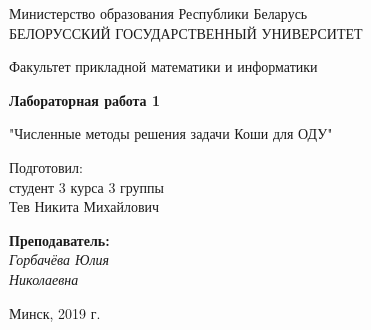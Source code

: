 \documentclass{article}%
\begin{document}
%

\begin{titlepage}
  \begin{center}
    \large
    Министерство образования Республики Беларусь\\
    \vspace{0.5cm}
    БЕЛОРУССКИЙ ГОСУДАРСТВЕННЫЙ УНИВЕРСИТЕТ
    \vspace{0.5cm}
     
    Факультет прикладной математики и информатики
\bigskip
\vfill
\vfill
\vfill
\vfill
\centerline{\Large \bf Лабораторная работа 1}
    \vspace{0.5cm}
\centerline{"Численные методы решения задачи Коши для ОДУ"}
\end{center}

\vspace*{\fill}
\vfill
\vfill
\vfill
\hfill
\begin{minipage}{0.25\textwidth}
{   Подготовил:\\ студент 3 курса 3 группы\\ Тев Никита Михайлович\\}
\end{minipage}

\mbox{}
\vfill
\hfill
\begin{minipage}{0.25\textwidth}
  {\large{\bf Преподаватель: } 
{\it\\ Горбачёва Юлия \\ Николаевна}}
\end{minipage}

\vspace*{\fill}
\vfill
\vfill
\vfill
\vfill
\vfill
\vfill
\vfill
\vfill
\vfill
\vspace*{\fill}
\begin{center}
Минск, 2019 г.
\end{center}
\end{titlepage}
\end{document}
